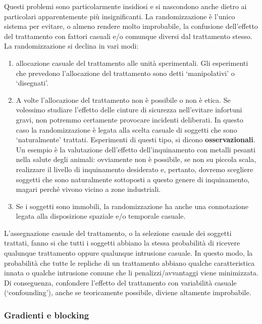 \documentclass[a4paper,12pt,oneside]{book}
\providecommand{\tightlist}{%
  \setlength{\itemsep}{0pt}\setlength{\parskip}{0pt}}
\begin{document}
Questi problemi sono particolarmente insidiosi e si nascondono anche
dietro ai particolari apparentemente più insignificanti. La
randomizzazione è l'unico sistema per evitare, o almeno rendere molto
improbabile, la confusione dell'effetto del trattamento con fattori
casuali e/o comunque diversi dal trattamento stesso. La randomizzazione
si declina in vari modi:

\begin{enumerate}
\def\labelenumi{\arabic{enumi}.}
\tightlist
\item
  allocazione casuale del trattamento alle unità sperimentali. Gli
  esperimenti che prevedono l'allocazione del trattamento sono detti
  `manipolativi' o `disegnati'.
\item
  A volte l'allocazione del trattamento non è possibile o non è etica.
  Se volessimo studiare l'effetto delle cinture di sicurezza
  nell'evitare infortuni gravi, non potremmo certamente provocare
  incidenti deliberati. In questo caso la randomizzazione è legata alla
  scelta casuale di soggetti che sono `naturalmente' trattati.
  Esperimenti di questi tipo, si dicono \textbf{osservazionali}. Un
  esempio è la valutazione dell'effetto dell'inquinamento con metalli
  pesanti nella salute degli animali: ovviamente non è possibile, se non
  su piccola scala, realizzare il livello di inquinamento desiderato e,
  pertanto, dovremo scegliere soggetti che sono naturalmente sottoposti
  a questo genere di inquinamento, magari perché vivono vicino a zone
  industriali.
\item
  Se i soggetti sono immobili, la randomizzazione ha anche una
  connotazione legata alla disposizione spaziale e/o temporale casuale.
\end{enumerate}

L'assegnazione casuale del trattamento, o la selezione casuale dei
soggetti trattati, fanno si che tutti i soggetti abbiano la stessa
probabilità di ricevere qualunque trattamento oppure qualunque
intrusione casuale. In questo modo, la probabilità che tutte le repliche
di un trattamento abbiano qualche caratteristica innata o qualche
intrusione comune che li penalizzi/avvantaggi viene minimizzata. Di
conseguenza, confondere l'effetto del trattamento con variabilità
casuale (`confounding'), anche se teoricamente possibile, diviene
altamente improbabile.

\subsubsection{Gradienti e blocking}\label{gradienti-e-blocking}
\end{document}
